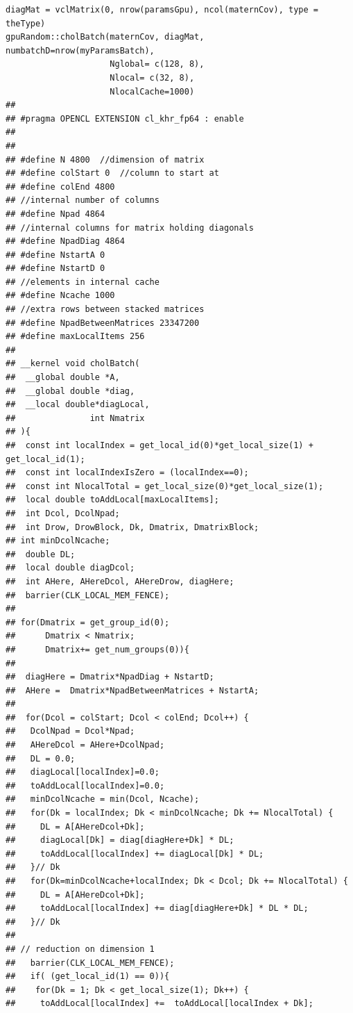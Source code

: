 \documentclass[article,nojss]{jss}\usepackage[]{graphicx}\usepackage[]{color}
\makeatletter
\newenvironment{kframe}{%
 \def\at@end@of@kframe{}%
 \ifinner\ifhmode%
  \def\at@end@of@kframe{\end{minipage}}%
  \begin{minipage}{\columnwidth}%
 \fi\fi%
 \def\FrameCommand##1{\hskip\@totalleftmargin \hskip-\fboxsep
 \colorbox{shadecolor}{##1}\hskip-\fboxsep
     \hskip-\linewidth \hskip-\@totalleftmargin \hskip\columnwidth}%
 \MakeFramed {\advance\hsize-\width
   \@totalleftmargin\z@ \linewidth\hsize
   \@setminipage}}%
 {\par\unskip\endMakeFramed%
 \at@end@of@kframe}
\newenvironment{knitrout}{}{} %
\makeatother
\begin{document}
\begin{knitrout}
\color{fgcolor}\begin{kframe}
\begin{verbatim}
diagMat = vclMatrix(0, nrow(paramsGpu), ncol(maternCov), type = theType)
gpuRandom::cholBatch(maternCov, diagMat, numbatchD=nrow(myParamsBatch),
                     Nglobal= c(128, 8),
                     Nlocal= c(32, 8),
                     NlocalCache=1000)
## 
## #pragma OPENCL EXTENSION cl_khr_fp64 : enable
## 
## 
## #define N 4800  //dimension of matrix
## #define colStart 0  //column to start at
## #define colEnd 4800
## //internal number of columns
## #define Npad 4864
## //internal columns for matrix holding diagonals
## #define NpadDiag 4864
## #define NstartA 0
## #define NstartD 0
## //elements in internal cache
## #define Ncache 1000
## //extra rows between stacked matrices
## #define NpadBetweenMatrices 23347200
## #define maxLocalItems 256
## 
## __kernel void cholBatch(
## 	__global double *A,
## 	__global double *diag,
##  __local double*diagLocal,
##               int Nmatrix
## ){
##  const int localIndex = get_local_id(0)*get_local_size(1) + get_local_id(1);
##  const int localIndexIsZero = (localIndex==0);
##  const int NlocalTotal = get_local_size(0)*get_local_size(1);
##  local double toAddLocal[maxLocalItems];
##  int Dcol, DcolNpad;
##  int Drow, DrowBlock, Dk, Dmatrix, DmatrixBlock;
## int minDcolNcache;
##  double DL;
##  local double diagDcol;
##  int AHere, AHereDcol, AHereDrow, diagHere;
##  barrier(CLK_LOCAL_MEM_FENCE);
## 
## for(Dmatrix = get_group_id(0);
##      Dmatrix < Nmatrix;
##      Dmatrix+= get_num_groups(0)){
## 
##  diagHere = Dmatrix*NpadDiag + NstartD;
##  AHere =  Dmatrix*NpadBetweenMatrices + NstartA;
## 
##  for(Dcol = colStart; Dcol < colEnd; Dcol++) {
##   DcolNpad = Dcol*Npad;
##   AHereDcol = AHere+DcolNpad;
##   DL = 0.0;
##   diagLocal[localIndex]=0.0;
##   toAddLocal[localIndex]=0.0;
##   minDcolNcache = min(Dcol, Ncache);
##   for(Dk = localIndex; Dk < minDcolNcache; Dk += NlocalTotal) {
##     DL = A[AHereDcol+Dk];
##     diagLocal[Dk] = diag[diagHere+Dk] * DL;
##     toAddLocal[localIndex] += diagLocal[Dk] * DL;
##   }// Dk
##   for(Dk=minDcolNcache+localIndex; Dk < Dcol; Dk += NlocalTotal) {
##     DL = A[AHereDcol+Dk];
##     toAddLocal[localIndex] += diag[diagHere+Dk] * DL * DL;
##   }// Dk
## 
## // reduction on dimension 1
##   barrier(CLK_LOCAL_MEM_FENCE);
##   if( (get_local_id(1) == 0)){
##    for(Dk = 1; Dk < get_local_size(1); Dk++) {
##     toAddLocal[localIndex] +=  toAddLocal[localIndex + Dk];

\end{verbatim}
\end{kframe}
\end{knitrout}
\end{document}
